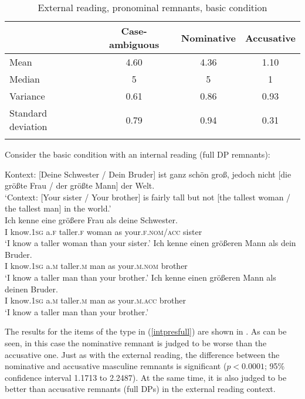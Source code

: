 \vfill
\begin{table}[H]
\begin{tabular}{l *3{S[table-format=1.2]}}
\lsptoprule
{} & {Case-ambiguous} & {Nominative} & {Accusative}\\\midrule
Mean & 4.60 & 4.36 & 1.10\\
Median & 5 & 5 & 1\\
Variance & 0.61 & 0.86 & 0.93\\
Standard deviation & 0.79 & 0.94 & 0.31\\
\lspbottomrule
\end{tabular}
\caption{External reading, pronominal remnants, basic condition}
\label{tableextprespro}
\end{table} 
\vfill\pagebreak


Consider the basic condition with an internal reading (full DP remnants):

\ea Kontext: [Deine Schwester / Dein Bruder] ist ganz schön groß, jedoch nicht [die größte Frau / der größte Mann] der Welt. \label{intpresfull}\\
`Context: [Your sister / Your brother] is fairly tall but not [the tallest woman / the tallest man] in the world.'\\
\ea \gll Ich kenne eine größere Frau als deine Schwester. \label{intpresfullambig}\\
I know.\textsc{1sg} a.\textsc{f} taller.\textsc{f} woman as your.\textsc{f.nom/acc} sister\\
\glt `I know a taller woman than your sister.'
\ex \gll Ich kenne einen größeren Mann als dein Bruder. \label{intpresfullnom}\\
I know.\textsc{1sg} a.\textsc{m} taller.\textsc{m} man as your.\textsc{m.nom} brother\\
\glt `I know a taller man than your brother.'
\ex \gll Ich kenne einen größeren Mann als deinen Bruder. \label{intpresfullacc}\\
I know.\textsc{1sg} a.\textsc{m} taller.\textsc{m} man as your.\textsc{m.acc} brother\\
\glt `I know a taller man than your brother.'
\z
\z

The results for the items of the type in (\ref{intpresfull}) are shown in .
As can be seen, in this case the nominative remnant is judged to be worse than the accusative one. Just as with the external reading, the difference between the nominative and accusative masculine remnants is significant ($p<0.0001$; 95\% confidence interval 1.1713 to 2.2487). At the same time, it is also judged to be better than accusative remnants (full DPs) in the external reading context.

